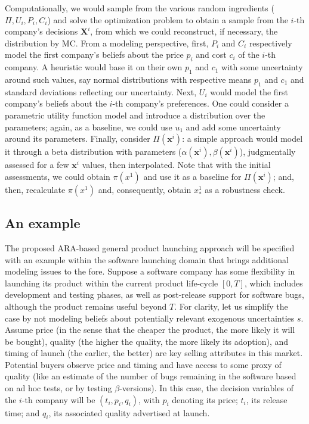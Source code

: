 \documentclass[a4paper,fleqn, 11pt]{cas-sc}
\begin{document}
    Computationally, we would sample from the various random ingredients ($\Pi , U_i, P_i, C_i$) and  
solve the optimization problem to obtain a sample from the 
$i$-th company's decisions ${\bm X}^i$, from which we could reconstruct, if necessary, the distribution by MC.
From a modeling perspective,
 first, $P_i$ and $C_i$ respectively model the first company's beliefs about the price $p_i$ and cost $c_i$ of the $i$-th company.
   A heuristic would base it on their own $p_1$ and $c_1$ with some uncertainty around such values, say normal distributions with  respective means $p_1$ and $c_1$ and standard deviations 
 reflecting our uncertainty.
  Next, $U_i$ would model the first company's beliefs about the 
  $i$-th company's preferences.   One could consider a parametric utility function model and introduce a distribution over the parameters; again, as a baseline, we could use $u_1$ and add some uncertainty around its parameters. 
Finally, consider $\Pi({\bm x}^i )$: a simple approach would model it through a beta distribution with parameters ($\alpha({\bm x}^i), \beta({\bm x}^i)$), judgmentally assessed for a few ${\bm x}^i$ values, then interpolated. Note that with the initial assessments, we could obtain $\pi (x^1)$  and  use it as a baseline for $\Pi({\bm x}^i )$; and, then, recalculate
$\pi (x^1)$ and, consequently, obtain $x^{1}_*$ as a robustness  check.



\subsection{An example}

The proposed ARA-based general %
  product launching approach will be specified with an example within the software launching domain that brings additional modeling issues to the fore. Suppose a software company has some flexibility in launching its product within the current product life-cycle
$[0,T]$, which includes development and testing phases, as well as post-release support for software bugs, although the 
  product remains useful
beyond $T$.
For clarity, let us simplify the case by not modeling 
beliefs about potentially relevant exogenous uncertainties $s$.
 Assume %
 price (in the sense that the cheaper the product, the more likely it will be bought), quality (the higher the quality, the more likely its adoption), and timing of launch (the earlier, the better) are key selling attributes in this market. Potential buyers %
   observe price and timing and have access to some proxy of quality (like an estimate of the number of bugs remaining in the software based on ad hoc tests, or by testing $\beta$-versions).  In this case, the decision variables 
    of the $i$-th company will be $(t_i, p_i, q_i)$, with $p_i$ denoting its price; $t_i$, its release time; and $q_i$, its associated quality advertised at launch. 
\end{document}
